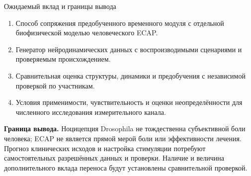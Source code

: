 \begin{frame}{Ожидаемый вклад и границы вывода}
\begin{enumerate}
\item Способ сопряжения предобученного временного модуля с отдельной биофизической моделью человеческого ECAP.
\item Генератор нейродинамических данных с воспроизводимыми сценариями и проверяемым происхождением.
\item Сравнительная оценка структуры, динамики и предобучения с независимой проверкой по участникам.
\item Условия применимости, чувствительность и оценки неопределённости для численного исследования измерительного канала.
\end{enumerate}
\SlideGap
\textbf{Граница вывода.} Ноцицепция Drosophila не тождественна субъективной боли человека; ECAP не является прямой мерой боли или эффективности лечения.
\SlideGap
Прогноз клинических исходов и настройка стимуляции потребуют самостоятельных разрешённых данных и проверки.
\SlideGap
Наличие и величина дополнительного вклада переноса будут установлены сравнительной проверкой.
\end{frame}
